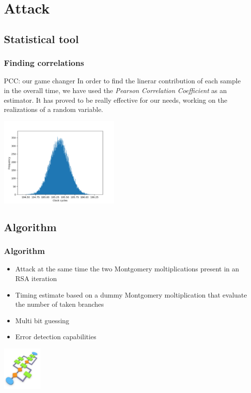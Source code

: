 \documentclass{beamer}
\begin{document}

\section{Attack}
\subsection{Statistical tool}
\begin{frame}[fragile]
	\frametitle{Finding correlations}
	\begin{block}{PCC: our game changer}
		In order to find the linerar contribution of each sample in the overall time, we have used the \textit{Pearson Correlation Coefficient} as an estimator. It has proved to be really effective for our needs, working on the realizations of a random variable.
	\end{block}
	\begin{center}
		\includegraphics[width=6cm]{./graphics/rand_distr}
	\end{center}
\end{frame}

\subsection{Algorithm}
\begin{frame}[fragile]
    \frametitle{Algorithm}
    \begin{block}{}
        \begin{itemize}
            \item Attack at the same time the two Montgomery moltiplications present in an RSA iteration
            \item Timing estimate based on a dummy Montgomery moltiplication that evaluate the number of taken branches
            \item Multi bit guessing
            \item Error detection capabilities
        \end{itemize}
    \end{block}
    \hfill \includegraphics[width=2cm]{./graphics/algorithm}
\end{frame}
\end{document}
